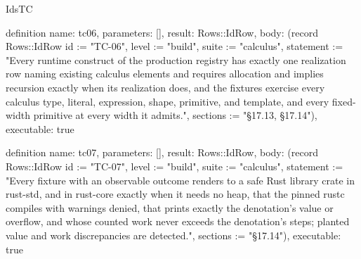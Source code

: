 \begin{lexlean}{IdsTC}
\begin{semanticmodule}
definition{
  name: tc06,
  parameters: [],
  result: Rows::IdRow,
  body: (record Rows::IdRow {id := "TC-06", level := "build", suite := "calculus", statement := "Every runtime construct of the production registry has exactly one realization row naming existing calculus elements and requires allocation and implies recursion exactly when its realization does, and the fixtures exercise every calculus type, literal, expression, shape, primitive, and template, and every fixed-width primitive at every width it admits.", sections := "§17.13, §17.14"}),
  executable: true
}

definition{
  name: tc07,
  parameters: [],
  result: Rows::IdRow,
  body: (record Rows::IdRow {id := "TC-07", level := "build", suite := "calculus", statement := "Every fixture with an observable outcome renders to a safe Rust library crate in rust-std, and in rust-core exactly when it needs no heap, that the pinned rustc compiles with warnings denied, that prints exactly the denotation's value or overflow, and whose counted work never exceeds the denotation's steps; planted value and work discrepancies are detected.", sections := "§17.14"}),
  executable: true
}
\end{semanticmodule}
\end{lexlean}
